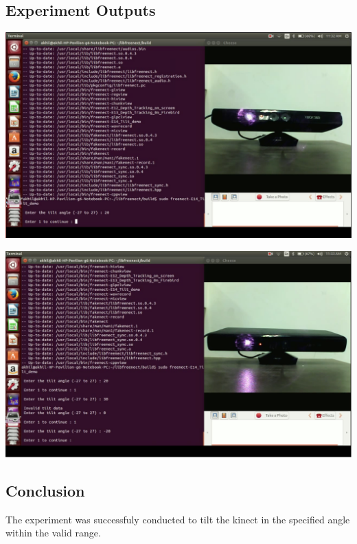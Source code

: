 \begin{flushleft}
\begin{enumerate}
\end{enumerate}
\medskip
\subsection{\textbf{ Experiment Outputs}}
\includegraphics[scale = 0.5]{e141}

\medskip
\includegraphics[scale = 0.5]{e142}
\medskip
\subsection{\textbf{ Conclusion}}
The experiment was successfuly conducted to tilt the kinect in the specified angle within the valid range.
\medskip


\end{flushleft}